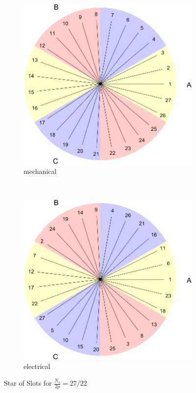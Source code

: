 \documentclass[a4paper, 11pt]{article}
\begin{document}
\begin{figure}[h!]
    \centering
    \begin{subfigure}[b]{0.45\textwidth}
        \includegraphics[width=\textwidth]{Q2_2722_starofSlots_mechanical.png}
        \caption{mechanical}
        \label{subfig:sos_2722_mech}
    \end{subfigure}
    ~ %
    \begin{subfigure}[b]{0.45\textwidth}
        \includegraphics[width=\textwidth]{Q2_2722_starofSlots_electrical.png}
        \caption{electrical}
        \label{subfig:sos_2722_elec}
    \end{subfigure}
    \caption{Star of Slots for $\frac{N_s}{2p}=27/22$}
    \label{fig:sos_2722}
\end{figure}
\end{document}
